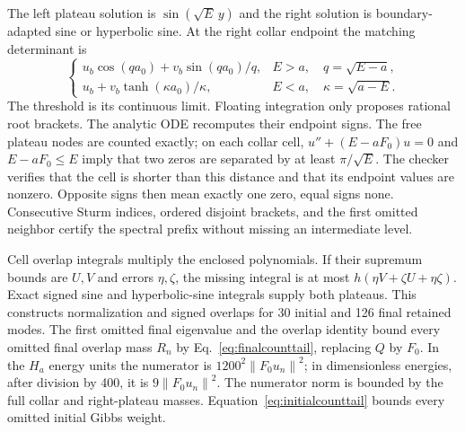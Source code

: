 \documentclass[aps,pra,reprint,superscriptaddress,longbibliography]{revtex4-2}
\newcommand{\norm}[1]{\left\lVert#1\right\rVert}
\begin{document}
The left plateau solution is $\sin(\sqrt E\,y)$ and the right
solution is boundary-adapted sine or hyperbolic sine. At the right
collar endpoint the matching determinant is
\begin{equation}
 \begin{cases}
 u_b\cos(qa_0)+v_b\sin(qa_0)/q,&E>a,\quad q=\sqrt{E-a},\\
 u_b+v_b\tanh(\kappa a_0)/\kappa,&E<a,\quad\kappa=\sqrt{a-E}.
 \end{cases}                                                  \label{eq:erfroot}
\end{equation}
The threshold is its continuous limit. Floating integration only
proposes rational root brackets. The analytic ODE recomputes their
endpoint signs. The free plateau nodes are counted exactly; on
each collar cell, $u''+(E-aF_0)u=0$ and $E-aF_0\le E$ imply
that two zeros are separated by at least $\pi/\sqrt E$.
The checker verifies that the cell is shorter than this distance
and that its endpoint values are nonzero. Opposite signs then
mean exactly one zero, equal signs none. Consecutive Sturm indices,
ordered disjoint brackets, and the first omitted neighbor certify
the spectral prefix without missing an intermediate level.

Cell overlap integrals multiply the enclosed polynomials. If their
supremum bounds are $U,V$ and errors $\eta,\zeta$, the missing
integral is at most $h(\eta V+\zeta U+\eta\zeta)$. Exact signed
sine and hyperbolic-sine integrals supply both plateaus. This
constructs normalization and signed overlaps for 30 initial and
126 final retained modes. The first omitted final eigenvalue
and the overlap identity bound every omitted final overlap mass
$R_n$ by Eq.~\eqref{eq:finalcounttail}, replacing $Q$ by $F_0$.
In the $H_a$ energy units the numerator is
$1200^2\norm{F_0u_n}^2$; in dimensionless energies, after division
by 400, it is $9\norm{F_0u_n}^2$. The numerator norm is bounded
by the full collar and right-plateau masses.
Equation~\eqref{eq:initialcounttail} bounds
every omitted initial Gibbs weight.
\end{document}
